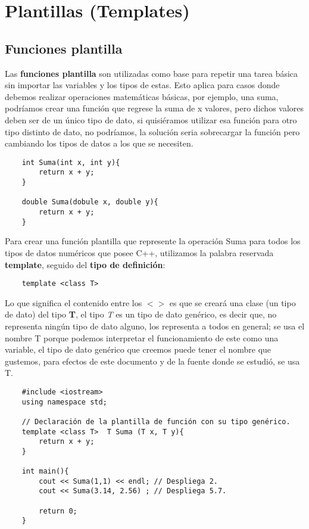 \section{Plantillas (Templates)}


\subsection{Funciones plantilla}

Las \textbf{funciones plantilla} son utilizadas como base para repetir una tarea básica sin importar las variables y los tipos de estas. Esto aplica para casos donde debemos realizar operaciones matemáticas básicas, por ejemplo, una suma, podríamos crear una función que regrese la suma de x valores, pero dichos valores deben ser de un único tipo de dato, si quisiéramos utilizar esa función para otro tipo distinto de dato, no podríamos, la solución seria sobrecargar la función pero cambiando los tipos de datos a los que se necesiten.
\begin{lstlisting}
    int Suma(int x, int y){
        return x + y;
    }
    
    double Suma(dobule x, double y){
        return x + y;
    }
\end{lstlisting}

Para crear una función plantilla que represente la operación Suma para todos los tipos de datos numéricos que posee C++, utilizamos la palabra reservada \textbf{template}, seguido del \textbf{tipo de definición}:
\begin{lstlisting}
    template <class T>
\end{lstlisting}

Lo que significa el contenido entre los \textbf{$< >$} es que se creará una clase (un tipo de dato) del tipo \textbf{T}, el tipo \textit{T} es un tipo de dato genérico, es decir que, no representa ningún tipo de dato alguno, los representa a todos en general; se usa el nombre T porque podemos interpretar el funcionamiento de este como una variable, el tipo de dato genérico que creemos puede tener el nombre que gustemos, para efectos de este documento y de la fuente donde se estudió, se usa T.
\begin{lstlisting}
    #include <iostream>
    using namespace std;

    // Declaración de la plantilla de función con su tipo genérico.
    template <class T>  T Suma (T x, T y){
        return x + y;
    }
    
    int main(){
        cout << Suma(1,1) << endl; // Despliega 2.
        cout << Suma(3.14, 2.56) ; // Despliega 5.7.
        
        return 0;
    }
\end{lstlisting}

